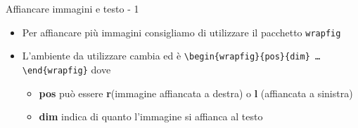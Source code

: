 \begin{frame}{Affiancare immagini e testo - 1}

\begin{itemize}
	\item Per affiancare più immagini consigliamo di utilizzare il pacchetto 
	\texttt{wrapfig}
	\item L'ambiente da utilizzare cambia ed è
	\texttt{\textbackslash{}begin\{wrapfig\}\{pos\}\{dim\}
	\dots{}\textbackslash{}end\{wrapfig\}} dove
	\begin{itemize}
		\item \textbf{pos} può essere \textbf{r}(immagine affiancata a destra)
		o \textbf{l} (affiancata a sinistra)
		\item \textbf{dim} indica di quanto l'immagine si affianca al testo
	\end{itemize}
\end{itemize}

\end{frame}